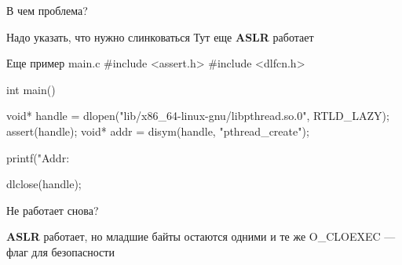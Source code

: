 В чем проблема?

Надо указать, что нужно слинковаться
Тут еще \textbf{ASLR} работает

Еще пример
main.c
#include <assert.h>
#include <dlfcn.h>

int main() {
    void* handle = dlopen("lib/x86_64-linux-gnu/libpthread.so.0", RTLD_LAZY);
    assert(handle);
    void* addr = disym(handle, "pthread_create");

    printf("Addr: %

    dlclose(handle);
}
Не работает снова?

\textbf{ASLR} работает, но младшие байты остаются одними и те же
O_CLOEXEC --- флаг для безопасности

